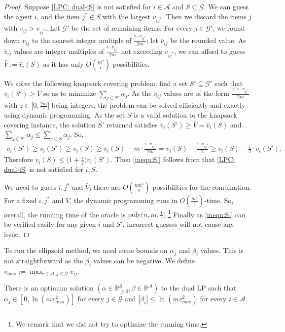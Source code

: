 \documentclass{theoretics}
\newcommand\calA{{\mathcal{A}}}
\newcommand\calG{{\mathcal{G}}}
\newcommand{\R}{{\mathbb{R}}}
\begin{document}
    \begin{proof}
        Suppose \eqref{LPC: dual-iS} is not satisfied for $i \in \calA$ and $S \subseteq \calG$. We can guess the agent $i$, and the item $j^* \in S$ with the largest $v_{ij^*}$. Then we discard the items $j$ with $v_{ij} > v_{ij^*}$. Let $\calG'$ be the set of remaining items.  For every $j \in \calG'$, we round down $v_{ij}$ to the nearest integer multiple of $\frac{\epsilon\cdot v_{ij^*}}{2m}$; let $\bar v_{ij}$ be the rounded value. As $\bar v_{ij}$ values are integer multiples of $\frac{\epsilon\cdot v_{ij^*}}{2m}$ not exceeding $v_{ij^*}$, we can afford to guess $\bar V := \bar v_i(S)$ as it has only $O(\frac{m^2}{\epsilon})$ possibilities. 

        We solve the following knapsack covering problem: find a set $S' \subseteq \calG'$ such that $\bar v_i(S') \geq \bar V$ so as to minimize $\sum_{j \in S'} \alpha_j$.  As the $\bar v_{ij}$ values are of the form $\frac{z \cdot \epsilon\cdot v_{ij^*}}{2m}$ with $z \in \Big[0, \frac{2m}{\epsilon}\Big]$ being integers, the problem can be solved efficiently and exactly using dynamic programming. As the set $S$ is a valid solution to the knapsack covering instance, the solution $S'$ returned satisfies $\bar v_i(S') \geq \bar V = \bar v_i(S)$ and $\sum_{j \in S'} \alpha_j \leq \sum_{j \in S} \alpha_j$. So, 
    \begin{align*}
        v_i(S') \geq \bar v_i(S') \geq \bar v_i(S) \geq v_i(S) - m\cdot \frac{\epsilon\cdot v_{ij^*}}{2m} = v_i(S) - \frac{\epsilon\cdot v_{ij^*}}{2} \geq v_i(S) - \frac{\epsilon}{2} \cdot v_i(S').
    \end{align*}
    Therefore $v_i(S) \leq \big(1 + \frac\epsilon2\big) v_i(S')$. Then \eqref{inequ:S'} follows from that \eqref{LPC: dual-iS} is not satisfied for $i, S$. 
        

    We need to guess $i, j^*$ and $\bar V$; there are $O(\frac{nm^3}{\epsilon})$ possibilities for the combination. For a fixed $i, j^*$ and $\bar V$, the dynamic programming runs in $O(\frac{m^3}{\epsilon})$-time. So, overall, the running time of the oracle is $\mathrm{poly}\big(n, m, \frac1\epsilon\big)$.\footnote{We remark that we did not try to optimize the running time.} Finally as \eqref{inequ:S'} can be verified easily for any given $i$ and $S'$, incorrect guesses will not cause any issue. 
    \end{proof}

    To run the ellipsoid method, we need some bounds on $\alpha_j$ and $\beta_i$ values. This is not straightforward as the $\beta_i$ values can be negative.  We define $v_{\max} := \max_{i \in \calA, j \in \calG} v_{ij}$.
    \begin{lemma}
        \label{lemma:bound-alpha-beta}
        There is an optimum solution $(\alpha \in \R_{\geq 0}^\calG, \beta \in \R^{\calA})$ to the dual LP such that $\alpha_j \in [0, \ln (m v_{\max}^2)]$ for every $j \in \calG$ and $|\beta_i| \leq \ln (mv_{\max}^2)$ for every $i \in \calA$.
    \end{lemma}
\end{document}
